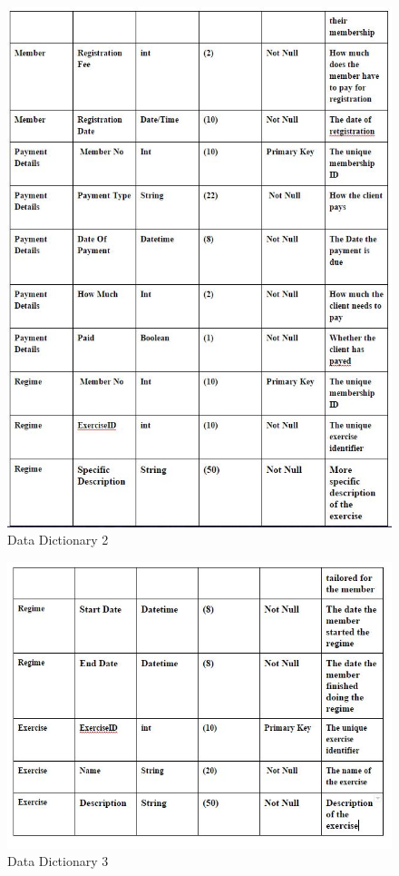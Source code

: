 \begin{itemize}
\begin{figure}[H]
    \includegraphics[width=\textwidth]{NewDict2.JPG}
    \caption{Data Dictionary 2} \label{fig: Data Destinations and Sources 2 }
\end{figure}

\begin{figure}[H]
    \includegraphics[width=\textwidth]{NewDict3.JPG}
    \caption{Data Dictionary 3} \label{fig: Data Destinations and Sources 2 }
\end{figure}


\end{itemize}
